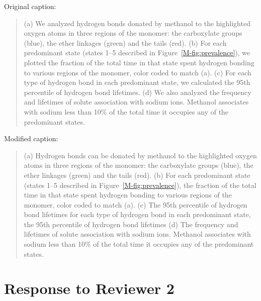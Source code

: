 \documentclass{article}
\begin{document}
\begin{enumerate}[label={Comment \theenumi :}, leftmargin=3.9\parindent]
    Original caption:
    \begin{quote}
    (a) We analyzed hydrogen bonds donated by methanol to the highlighted oxygen
    atoms in three regions of the monomer: the carboxylate groups (blue), the ether linkages
    (green) and the tails (red). (b) For each predominant state (states 1--5 described in 
    Figure~\ref{M-fig:prevalence}), we plotted the fraction of the total time in that state 
    spent hydrogen bonding to various regions of the monomer, color coded to match (a).
    (c) For each type of hydrogen bond in each predominant state, we calculated the 95th percentile
    of hydrogen bond lifetimes. (d) We also analyzed the frequency and lifetimes of solute 
    association with sodium ions. Methanol associates with sodium less than 10\% of the total 
    time it occupies any of the predominant states.
    \end{quote}    
    
    Modified caption:
    \begin{quote}
    (a) Hydrogen bonds can be donated by methanol to the highlighted oxygen atoms in three 
    regions of the monomer: the carboxylate groups (blue), the ether linkages (green) and the
    tails (red). (b) For each predominant state (states 1--5 described in Figure~\ref{M-fig:prevalence}),
    the fraction of the total time in that state spent hydrogen bonding to various regions
    of the monomer, color coded to match (a). (c) The 95th percentile of hydrogen bond lifetimes for
    each type of hydrogen bond in each predominant state, the 95th percentile of hydrogen bond lifetimes
    (d) The frequency and lifetimes of solute association with sodium ions. Methanol associates with sodium
    less than 10\% of the total time it occupies any of the predominant states.    
    \end{quote}

\end{enumerate}


\section*{Response to Reviewer 2}
\end{document}
